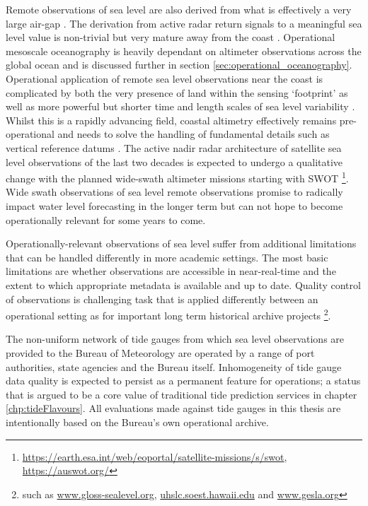 Remote observations of sea level are also derived from what is effectively a very large air-gap .   The derivation from active radar return signals to a meaningful sea level value is non-trivial but very mature away from the coast \citep{Fu:2001ub}.  Operational mesoscale oceanography is heavily dependant on altimeter observations across the global ocean and is discussed further in section \ref{sec:operational_oceanography}.  
Operational application of remote sea level observations near the coast is complicated by both the very presence of land within the sensing `footprint' as well as more powerful but shorter time and length scales of sea level variability \citep{Vignudelli:2011wl}.   Whilst this is a  rapidly advancing field, coastal altimetry effectively remains pre-operational and needs to solve the handling of fundamental details such as vertical reference datums \citep{10.3389/fmars.2020.549467}.
The active nadir radar architecture of satellite sea level observations of the last two decades is expected to undergo a qualitative change with the planned wide-swath altimeter missions starting with SWOT \footnote{\url{https://earth.esa.int/web/eoportal/satellite-missions/s/swot}, \url{https://auswot.org/}}.   Wide swath observations of sea level remote observations promise to radically impact water level forecasting in the longer term but can not hope to become operationally relevant for some years to come. 

Operationally-relevant observations of sea level suffer from additional limitations that can be handled differently in more academic settings.   The most basic limitations are whether observations are accessible in near-real-time and the extent to which appropriate metadata is available and up to date.  
Quality control of observations is challenging task that is applied differently between an operational setting as for important long term historical archive projects \footnote{such as \url{www.gloss-sealevel.org}, \url{uhslc.soest.hawaii.edu} and \url{www.gesla.org}}.

The non-uniform network of tide gauges from which sea level observations are provided to the Bureau of Meteorology are operated by a range of port authorities, state agencies and the Bureau itself. Inhomogeneity of tide gauge data quality is expected to persist as a permanent feature for operations; a status that is argued to be a core value of traditional tide prediction services in chapter \ref{chp:tideFlavours}. All evaluations made against tide gauges in this thesis are intentionally based on the Bureau's own operational archive.

